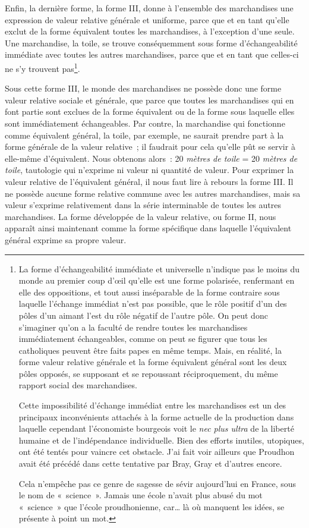 \documentclass[french,twoside]{book} %
\begin{document}
Enfin, la dernière forme, la forme III, donne à l’ensemble des marchandises une expression de valeur relative générale et uniforme, parce que et en tant qu’elle exclut de la forme équivalent toutes les marchandises, à l’exception d’une seule. Une marchandise, la toile, se trouve conséquemment sous forme d’échangeabilité immédiate avec toutes les autres marchandises, parce que et en tant que celles-ci ne s’y trouvent pas\footnote{ \noindent La forme d’échangeabilité immédiate et universelle n’indique pas le moins du monde au premier coup d’œil qu’elle est une forme polarisée, renfermant en elle des oppositions, et tout aussi inséparable de la forme contraire sous laquelle l’échange immédiat n’est pas possible, que le rôle positif d’un des pôles d’un aimant l’est du rôle négatif de l’autre pôle. On peut donc s’imaginer qu’on a la faculté de rendre toutes les marchandises immédiatement échangeables, comme on peut se figurer que tous les catholiques peuvent être faits papes en même temps. Mais, en réalité, la forme valeur relative générale et la forme équivalent général sont les deux pôles opposés, se supposant et se repoussant réciproquement, du même rapport social des marchandises.\par
 Cette impossibilité d’échange immédiat entre les marchandises est un des principaux inconvénients attachés à la forme actuelle de la production dans laquelle cependant l’économiste bourgeois voit le \emph{nec plus ultra} de la liberté humaine et de l’indépendance individuelle. Bien des efforts inutiles, utopiques, ont été tentés pour vaincre cet obstacle. J’ai fait voir ailleurs que Proudhon avait été précédé dans cette tentative par Bray, Gray et d’autres encore.\par
 Cela n’empêche pas ce genre de sagesse de sévir aujourd’hui en France, sous le nom de « science ». Jamais une école n’avait plus abusé du mot « science » que l’école proudhonienne, car… là où manquent les idées, se présente à point un mot.
}.\par
Sous cette forme III, le monde des marchandises ne possède donc une forme valeur relative sociale et générale, que parce que toutes les marchandises qui en font partie sont exclues de la forme équivalent ou de la forme sous laquelle elles sont immédiatement échangeables. Par contre, la marchandise qui fonctionne comme équivalent général, la toile, par exemple, ne saurait prendre part à la forme générale de la valeur relative ; il faudrait pour cela qu’elle pût se servir à elle-même d’équivalent. Nous obtenons alors : 20 \emph{mètres de toile} = 20 \emph{mètres de toile}, tautologie qui n’exprime ni valeur ni quantité de valeur. Pour exprimer la valeur relative de l’équivalent général, il nous faut lire à rebours la forme III. Il ne possède aucune forme relative commune avec les autres marchandises, mais sa valeur s’exprime relativement dans la série interminable de toutes les autres marchandises. La forme développée de la valeur relative, ou forme II, nous apparaît ainsi maintenant comme la forme spécifique dans laquelle l’équivalent général exprime sa propre valeur.
\end{document}
